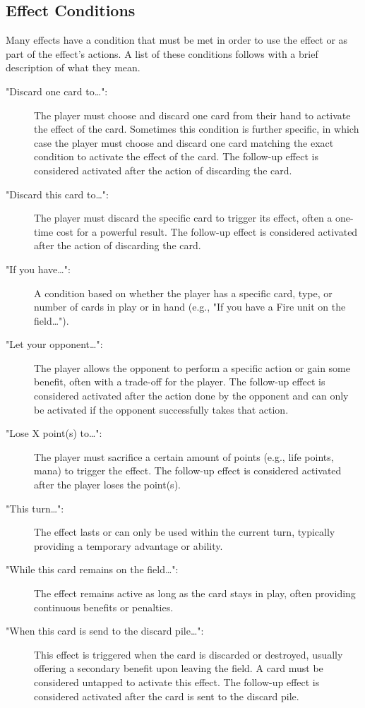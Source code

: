 \subsection{Effect Conditions}
Many effects have a condition that must be met in order to use the effect or as part of the effect's actions. A list of these conditions follows with a brief description of what they mean.
\begin{description}
  \item["Discard one card to\dots":] The player must choose and discard one card from their hand to activate the effect of the card. Sometimes this condition is further specific, in which case the player must choose and discard one card matching the exact condition to activate the effect of the card. The  follow-up effect is considered activated after the action of discarding the card.
  \item["Discard this card to\dots":] The player must discard the specific card to trigger its effect, often a one-time cost for a powerful result. The  follow-up effect is considered activated after the action of discarding the card.
  \item["If you have\dots":] A condition based on whether the player has a specific card, type, or number of cards in play or in hand (e.g., "If you have a Fire unit on the field\dots").
  \item["Let your opponent\dots":] The player allows the opponent to perform a specific action or gain some benefit, often with a trade-off for the player. The follow-up effect is considered activated after the action done by the opponent and can only be activated if the opponent successfully takes that action.
  \item["Lose X point(s) to\dots":] The player must sacrifice a certain amount of points (e.g., life points, mana) to trigger the effect. The follow-up effect is considered activated after the player loses the point(s).
  \item["This turn\dots":] The effect lasts or can only be used within the current turn, typically providing a temporary advantage or ability.
  \item["While this card remains on the field\dots":] The effect remains active as long as the card stays in play, often providing continuous benefits or penalties.
  \item["When this card is send to the discard pile\dots":] This effect is triggered when the card is discarded or destroyed, usually offering a secondary benefit upon leaving the field. A card must be considered untapped to activate this effect. The follow-up effect is considered activated after the card is sent to the discard pile.

\end{description}
